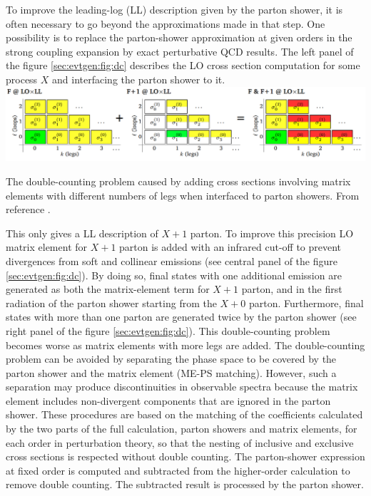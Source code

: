 To improve the leading-log (LL) description given by the parton shower, it is often necessary to go beyond the approximations made in that step. One possibility is to replace the parton-shower approximation at given orders in the strong coupling expansion by exact perturbative QCD results. The left panel of the figure \ref{sec:evtgen:fig:dc} describes the LO cross section computation for some process $X$ and interfacing the parton shower to it.
\bfig[t!]
\includegraphics[width=\textwidth]{figures/EvtGen/doublecounting.png}
\captionsetup{width=0.85\textwidth} \caption{\small The double-counting problem caused by adding cross sections involving matrix elements with different numbers of legs when interfaced to parton showers. From reference \cite{Skands:2012ts}.}
\label{sec:evtgen:fig:dc}
\efig
This only gives a LL description of $X+1$ parton. To improve this precision LO matrix element for $X+1$ parton is added with an infrared cut-off to prevent divergences from soft and collinear emissions (see central panel of the figure \ref{sec:evtgen:fig:dc}).  By doing so, final states with one additional emission are generated as both the matrix-element term for $X + 1$ parton, and in the first radiation of the parton shower starting from the $X + 0$ parton.  Furthermore, final states with more than one parton are generated twice by the parton shower (see right panel of the figure \ref{sec:evtgen:fig:dc}). This
double-counting problem becomes worse as matrix elements with more legs are added. The double-counting problem can be avoided by separating the phase space to be covered by the parton shower and the matrix element (ME-PS matching). However, such a separation may produce discontinuities in observable spectra because the matrix element includes non-divergent components that are ignored in the parton shower. These procedures are based on the matching of the coefficients calculated by the two parts of the full calculation, parton showers and matrix elements, for each order in perturbation theory, so that the nesting of inclusive and exclusive cross sections is respected without double counting. The  parton-shower  expression  at  fixed  order  is  computed  and  subtracted  from  the  higher-order calculation to remove double counting.  The subtracted result is processed by the parton shower.\par
